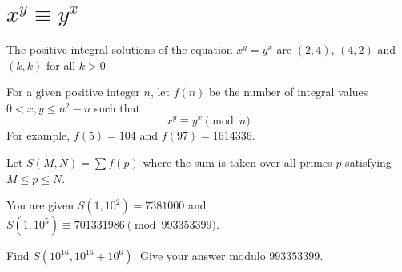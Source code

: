 \section[Problem \#801: $x^y ≡ y^x$]{$x^y ≡ y^x$}
\label{sec:problem_801}

The positive integral solutions of the equation $x^y=y^x$ are
$(2,4)$, $(4,2)$ and $(k,k)$ for
all $k > 0$.

For a given positive integer $n$, let
$f(n)$ be the number of integral values
$0 < x,y \leq n^2-n$ such that $$x^y\equiv y^x \pmod n$$ For example,
$f(5)=104$ and $f(97)=1614336$.

Let $S(M,N)=\sum f(p)$ where the sum is taken over all primes
$p$ satisfying $M\le p\le N$.

You are given $S(1,10^2)=7381000$ and $S(1,10^5) \equiv 701331986 \pmod{993353399}$.

Find $S(10^{16}, 10^{16}+10^6)$. Give your answer modulo
$993353399$.
